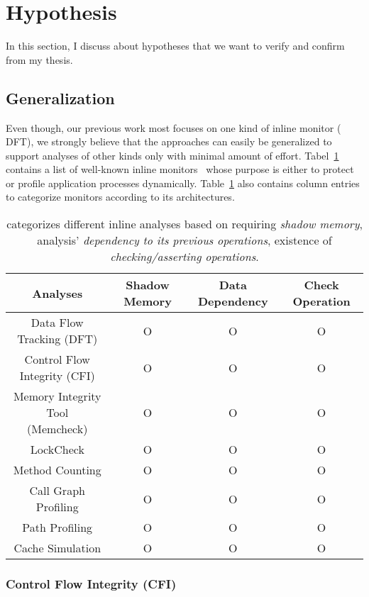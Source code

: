 \section{Hypothesis} \label{sec:hypo} 

In this section, I discuss about hypotheses that we want to verify and confirm
from my thesis.

\subsection{\sreplica Generalization}

Even though, our previous work most focuses on one kind of inline monitor (\ie
DFT), we strongly believe that the approaches can easily be generalized to
support analyses of other kinds only with minimal amount of effort.
Tabel~\ref{tab:analyses} contains a list of well-known inline
monitors~\cite{CAB} whose purpose is either to protect or profile application
processes dynamically. Table~\ref{tab:analyses} also contains column entries to
categorize monitors according to its architectures. 

\begin{table}[h]
\begin{tabular}{|c|c|c|c|}
\hline
Analyses & Shadow Memory & Data Dependency & Check Operation \\ 
\hline \hline
Data Flow Tracking (DFT) & O & O & O \\ \hline
Control Flow Integrity (CFI) & O & O & O \\ \hline
\specialcell{Memory Integrity Tool \\ (Memcheck)} & O & O & O \\ \hline
LockCheck & O & O & O \\ \hline
Method Counting & O & O & O \\ \hline
Call Graph Profiling & O & O & O \\ \hline
Path Profiling & O & O & O \\ \hline
Cache Simulation & O & O & O \\ \hline
\end{tabular}
\caption{ categorizes different inline analyses based on requiring {\it shadow
memory}, analysis' {\it dependency to its previous operations}, existence of
{\it checking/asserting operations}. \label{tab:analyses}}
\end{table}

\subsubsection{Control Flow Integrity (CFI)}

